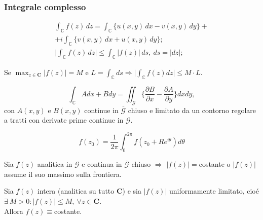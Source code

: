 \subsubsection*{Integrale complesso}
\begin{gather*}
    \int_\mathbb{C} f(z)\, dz = \int_\mathbb{C} \{u(x,y)\,dx-v(x,y)\,dy\} +\\+ i\int_\mathbb{C}\{v(x,y)\,dx + u(x,y)\,dy\};\\
    \Big|\int_\mathbb{C} f(z) \,dz\Big| \le \int_\mathbb{C} |f(z)| \,ds, \ ds=|dz|;
\end{gather*}
\begin{lemma}[di Darboux]
        Se $\displaystyle \max_{z\in\mathbf{C}}|f(z)| = M$ e $L=\int_\mathbb{C} ds \Rightarrow \Big|\int_\mathbb{C} f(z) dz\Big| \le M\cdot L$.
    \end{lemma}

    \begin{fdg}
        \[
            \int_\mathbb{C} Adx+Bdy=\iint_\mathcal{G}\Big\{\frac{\partial B}{\partial x}-\frac{\partial A}{\partial y}\Big\}dxdy,
        \]
        con $A(x,y)$ e $B(x,y)$ continue in $\overline{\mathcal{G}}$ chiuso e limitato da un contorno regolare a tratti con derivate prime continue in $\mathcal{G}$.
    \end{fdg}
    
    \begin{fdvm}
        \[
            f(z_0) = \frac{1}{2\pi}\int_0^{2\pi}f(z_0+Re^{i\theta})d\theta    
        \]
    \end{fdvm}
    
    \begin{pdmm}
        Sia $f(z)$ analitica in $\mathcal{G}$ e continua in $\overline{\mathcal{G}}$ chiuso $\Rightarrow$ $|f(z)|=$costante o $|f(z)|$ assume il suo massimo sulla frontiera.
    \end{pdmm}
    
    \begin{theorem}[di Liouville]
        Sia $f(z)$ intera (analitica su tutto $\mathbf{C}$) e sia $|f(z)|$ uniformamente limitato, cioé $\exists\ M>0:|f(z)|\le M,\ \forall z\in \mathbf{C}$. \\
        Allora $f(z)\equiv$costante.
    \end{theorem}


